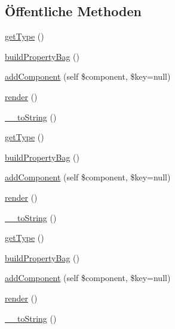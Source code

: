 \subsection*{Öffentliche Methoden}
\begin{DoxyCompactItemize}
\item 
\mbox{\hyperlink{class_eluceo_1_1i_cal_1_1_component_aa6d20c67a9852dd5ca7951c996a98418}{get\+Type}} ()
\item 
\mbox{\hyperlink{class_eluceo_1_1i_cal_1_1_component_a07ad9d3af0984b1299433a37b30c6608}{build\+Property\+Bag}} ()
\item 
\mbox{\hyperlink{class_eluceo_1_1i_cal_1_1_component_a5adac138a8cda08ed3c60b298cc9e145}{add\+Component}} (self \$component, \$key=null)
\item 
\mbox{\hyperlink{class_eluceo_1_1i_cal_1_1_component_a66f0174f6e8d985c704378470f326aff}{render}} ()
\item 
\mbox{\hyperlink{class_eluceo_1_1i_cal_1_1_component_a34a07b7c39eedd49d4ef421b2d1dddd9}{\+\_\+\+\_\+to\+String}} ()
\item 
\mbox{\hyperlink{class_eluceo_1_1i_cal_1_1_component_aa6d20c67a9852dd5ca7951c996a98418}{get\+Type}} ()
\item 
\mbox{\hyperlink{class_eluceo_1_1i_cal_1_1_component_a07ad9d3af0984b1299433a37b30c6608}{build\+Property\+Bag}} ()
\item 
\mbox{\hyperlink{class_eluceo_1_1i_cal_1_1_component_a5adac138a8cda08ed3c60b298cc9e145}{add\+Component}} (self \$component, \$key=null)
\item 
\mbox{\hyperlink{class_eluceo_1_1i_cal_1_1_component_a66f0174f6e8d985c704378470f326aff}{render}} ()
\item 
\mbox{\hyperlink{class_eluceo_1_1i_cal_1_1_component_a34a07b7c39eedd49d4ef421b2d1dddd9}{\+\_\+\+\_\+to\+String}} ()
\item 
\mbox{\hyperlink{class_eluceo_1_1i_cal_1_1_component_aa6d20c67a9852dd5ca7951c996a98418}{get\+Type}} ()
\item 
\mbox{\hyperlink{class_eluceo_1_1i_cal_1_1_component_a07ad9d3af0984b1299433a37b30c6608}{build\+Property\+Bag}} ()
\item 
\mbox{\hyperlink{class_eluceo_1_1i_cal_1_1_component_a5adac138a8cda08ed3c60b298cc9e145}{add\+Component}} (self \$component, \$key=null)
\item 
\mbox{\hyperlink{class_eluceo_1_1i_cal_1_1_component_a66f0174f6e8d985c704378470f326aff}{render}} ()
\item 
\mbox{\hyperlink{class_eluceo_1_1i_cal_1_1_component_a34a07b7c39eedd49d4ef421b2d1dddd9}{\+\_\+\+\_\+to\+String}} ()
\end{DoxyCompactItemize}
